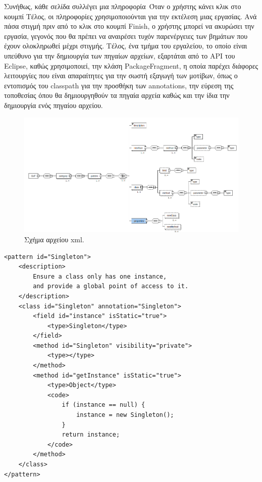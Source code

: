 Συνήθως, κάθε σελίδα συλλέγει μια πληροφορία\anotelia \  Όταν ο χρήστης κάνει κλικ στο κουμπί Τέλος, οι πληροφορίες χρησιμοποιούνται 
για την εκτέλεση μιας εργασίας. Ανά πάσα στιγμή πριν από το κλικ στο κουμπί Finish, ο χρήστης μπορεί να ακυρώσει την εργασία, 
γεγονός που θα πρέπει να αναιρέσει τυχόν παρενέργειες των βημάτων που έχουν ολοκληρωθεί μέχρι στιγμής. Τέλος, ένα τμήμα 
του εργαλείου, το οποίο είναι υπεύθυνο για την δημιουργία των πηγαίων αρχείων, εξαρτάται από το API του Eclipse, καθώς χρησιμοποιεί, 
την κλάση PackageFragment, η οποία παρέχει διάφορες λειτουργίες που είναι απαραίτητες για την σωστή εξαγωγή των μοτίβων, 
όπως ο εντοπισμός του classpath για την προσθήκη των annotations, την εύρεση της τοποθεσίας όπου θα δημιουργηθούν τα πηγαία αρχεία 
καθώς και την ίδια την δημιουργία ενός πηγαίου αρχείου.

\begin{figure}[H]
    \centering
    \includegraphics[width=1.0\textwidth]{Figures/xsd_diagram.png}
    \caption{Σχήμα αρχείου xml.}
    \label{fig:xsd}
\end{figure}
\newpage
\begin{lstlisting}[label=code:xml, caption=Περιγραφή μοτίβου Singleton.]
<pattern id="Singleton">
    <description>
        Ensure a class only has one instance, 
        and provide a global point of access to it.
    </description>
    <class id="Singleton" annotation="Singleton">
        <field id="instance" isStatic="true">
            <type>Singleton</type>
        </field>
        <method id="Singleton" visibility="private">
            <type></type>
        </method>
        <method id="getInstance" isStatic="true">
            <type>Object</type>
            <code>
                if (instance == null) {
                    instance = new Singleton();
                }
                return instance;
            </code>
        </method>
    </class>
</pattern>
\end{lstlisting}
